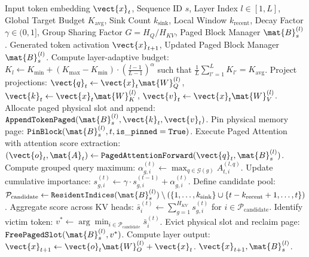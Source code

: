 \begin{algorithm}[t]
\caption[Online Dynamic KV-Cache Eviction with Sinks, GQA Max-Pooling, and Layer Budgets]{\textbf{Online Dynamic KV-Cache Eviction with Attention Sinks, Grouped-Query Max-Pooling, and Layer-Adaptive Budget Allocation}}
\label{alg:kv_eviction_pipeline}
\begin{algorithmic}[1]
\REQUIRE Input token embedding $\vect{x}_t$, Sequence ID $s$, Layer Index $l \in [1, L]$, Global Target Budget $K_{\text{avg}}$, Sink Count $k_{\text{sink}}$, Local Window $k_{\text{recent}}$, Decay Factor $\gamma \in (0, 1]$, Group Sharing Factor $G = H_Q / H_{KV}$, Paged Block Manager $\mat{B}_s^{(l)}$.
\ENSURE Generated token activation $\vect{x}_{t+1}$, Updated Paged Block Manager $\mat{B}_s^{(l)}$.
\STATE Compute layer-adaptive budget: $K_l \leftarrow K_{\min} + (K_{\max} - K_{\min}) \cdot \left(\frac{l-1}{L-1}\right)^\alpha$ such that $\frac{1}{L}\sum_{l'=1}^L K_{l'} = K_{\text{avg}}$.
\STATE Project projections: $\vect{q}_t \leftarrow \vect{x}_t \mat{W}_Q^{(l)}$, $\vect{k}_t \leftarrow \vect{x}_t \mat{W}_K^{(l)}$, $\vect{v}_t \leftarrow \vect{x}_t \mat{W}_V^{(l)}$.
\STATE Allocate paged physical slot and append: $\mathtt{AppendTokenPaged}(\mat{B}_s^{(l)}, \vect{k}_t, \vect{v}_t)$.
    \STATE Pin physical memory page: $\mathtt{PinBlock}(\mat{B}_s^{(l)}, t, \mathtt{is\_pinned=True})$.
\ENDIF
\STATE Execute Paged Attention with attention score extraction: $(\vect{o}_t, \mat{A}_t) \leftarrow \mathtt{PagedAttentionForward}(\vect{q}_t, \mat{B}_s^{(l)})$.
        \STATE Compute grouped query maximum: $\alpha_{g, i}^{(t)} \leftarrow \max_{q \in \mathcal{G}(g)} A_{t, i}^{(l, q)}$.
        \STATE Update cumulative importance: $s_{g, i}^{(t)} \leftarrow \gamma \cdot s_{g, i}^{(t-1)} + \alpha_{g, i}^{(t)}$.
    \ENDFOR
\ENDFOR
{}
    \STATE Define candidate pool: $\mathcal{P}_{\text{candidate}} \leftarrow \mathtt{ResidentIndices}(\mat{B}_s^{(l)}) \setminus \left( \{1, \dots, k_{\text{sink}}\} \cup \{t - k_{\text{recent}} + 1, \dots, t\} \right)$.
    \STATE Aggregate score across KV heads: $\bar{s}_i^{(t)} \leftarrow \sum_{g=1}^{H_{KV}} s_{g, i}^{(t)}$ for $i \in \mathcal{P}_{\text{candidate}}$.
    \STATE Identify victim token: $v^* \leftarrow \arg\min_{i \in \mathcal{P}_{\text{candidate}}} \bar{s}_i^{(t)}$.
    \STATE Evict physical slot and reclaim page: $\mathtt{FreePagedSlot}(\mat{B}_s^{(l)}, v^*)$.
\ENDIF
\STATE Compute layer output: $\vect{x}_{t+1} \leftarrow \vect{o}_t \mat{W}_O^{(l)} + \vect{x}_t$.
\RETURN $\vect{x}_{t+1}, \mat{B}_s^{(l)}$.
\end{algorithmic}
\end{algorithm}

